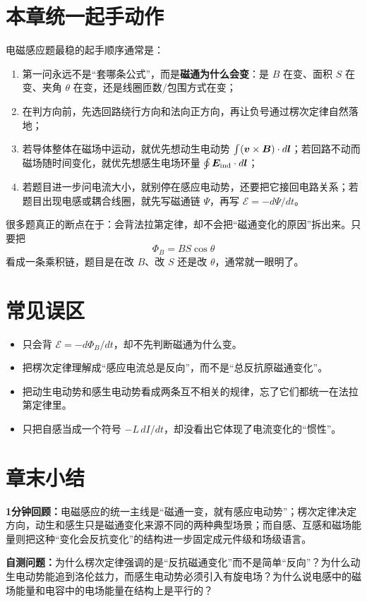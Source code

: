 \documentclass[lang=cn,11pt]{elegantbook}
\newcommand{\summaryline}[1]{\par\noindent\textbf{1分钟回顾：}#1\par}
\newcommand{\chapterselfcheck}[1]{\par\noindent\textbf{自测问题：}#1\par}
\begin{document}
\section{本章统一起手动作}

电磁感应题最稳的起手顺序通常是：
\begin{enumerate}
  \item 第一问永远不是“套哪条公式”，而是\textbf{磁通为什么会变}：是 \(B\) 在变、面积 \(S\) 在变、夹角 \(\theta\) 在变，还是线圈匝数/包围方式在变；
  \item 在判方向前，先选回路绕行方向和法向正方向，再让负号通过楞次定律自然落地；
  \item 若导体整体在磁场中运动，就优先想动生电动势 \(\int(\vb*{v}\times\vb*{B})\cdot d\vb*{l}\)；若回路不动而磁场随时间变化，就优先想感生电场环量 \(\oint \vb*{E}_{\mathrm{ind}}\cdot d\vb*{l}\)；
  \item 若题目进一步问电流大小，就别停在感应电动势，还要把它接回电路关系；若题目出现电感或耦合线圈，就先写磁通链 \(\Psi\)，再写 \(\mathcal{E}=-d\Psi/dt\)。
\end{enumerate}

\begin{remark}
很多题真正的断点在于：会背法拉第定律，却不会把“磁通变化的原因”拆出来。只要把
\[
\Phi_B=BS\cos\theta
\]
看成一条乘积链，题目是在改 \(B\)、改 \(S\) 还是改 \(\theta\)，通常就一眼明了。
\end{remark}

\section{常见误区}

\begin{itemize}
  \item 只会背 \(\mathcal{E}=-d\Phi_B/dt\)，却不先判断磁通为什么变。
  \item 把楞次定律理解成“感应电流总是反向”，而不是“总反抗原磁通变化”。
  \item 把动生电动势和感生电动势看成两条互不相关的规律，忘了它们都统一在法拉第定律里。
  \item 只把自感当成一个符号 \(-L\,dI/dt\)，却没看出它体现了电流变化的“惯性”。
\end{itemize}

\section{章末小结}

\summaryline{电磁感应的统一主线是“磁通一变，就有感应电动势”；楞次定律决定方向，动生和感生只是磁通变化来源不同的两种典型场景；而自感、互感和磁场能量则把这种“变化会反抗变化”的结构进一步固定成元件级和场级语言。}
\chapterselfcheck{为什么楞次定律强调的是“反抗磁通变化”而不是简单“反向”？为什么动生电动势能追到洛伦兹力，而感生电动势必须引入有旋电场？为什么说电感中的磁场能量和电容中的电场能量在结构上是平行的？}
\end{document}
